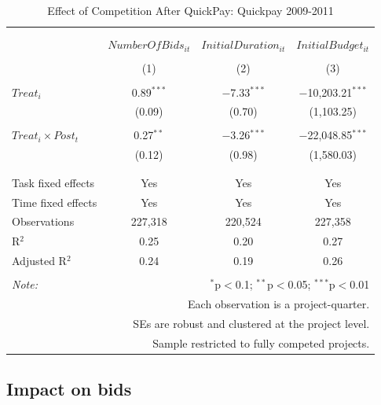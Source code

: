 \documentclass[]{article}
\begin{document}
\begin{table}[H] \centering 
  \caption{Effect of Competition After QuickPay: Quickpay 2009-2011} 
  \label{} 
\small 
\begin{tabular}{@{\extracolsep{0pt}}lccc} 
\\[-1.8ex]\hline 
\hline \\[-1.8ex] 
\\[-1.8ex] & $NumberOfBids_{it}$ & $InitialDuration_{it}$ & $InitialBudget_{it}$ \\ 
\\[-1.8ex] & (1) & (2) & (3)\\ 
\hline \\[-1.8ex] 
 $Treat_i$ & 0.89$^{***}$ & $-$7.33$^{***}$ & $-$10,203.21$^{***}$ \\ 
  & (0.09) & (0.70) & (1,103.25) \\ 
  & & & \\ 
 $Treat_i \times Post_t$ & 0.27$^{**}$ & $-$3.26$^{***}$ & $-$22,048.85$^{***}$ \\ 
  & (0.12) & (0.98) & (1,580.03) \\ 
  & & & \\ 
\hline \\[-1.8ex] 
Task fixed effects & Yes & Yes & Yes \\ 
Time fixed effects & Yes & Yes & Yes \\ 
Observations & 227,318 & 220,524 & 227,358 \\ 
R$^{2}$ & 0.25 & 0.20 & 0.27 \\ 
Adjusted R$^{2}$ & 0.24 & 0.19 & 0.26 \\ 
\hline 
\hline \\[-1.8ex] 
\textit{Note:}  & \multicolumn{3}{r}{$^{*}$p$<$0.1; $^{**}$p$<$0.05; $^{***}$p$<$0.01} \\ 
 & \multicolumn{3}{r}{Each observation is a project-quarter.} \\ 
 & \multicolumn{3}{r}{SEs are robust and clustered at the project level.} \\ 
 & \multicolumn{3}{r}{Sample restricted to fully competed projects.} \\ 
\end{tabular} 
\end{table}

\hypertarget{impact-on-bids}{%
\subsection{Impact on bids}\label{impact-on-bids}}
\end{document}
